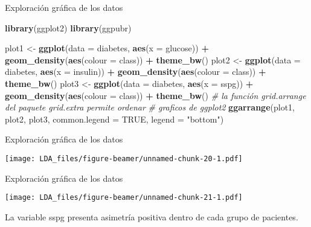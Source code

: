 \documentclass[ignorenonframetext,]{beamer}
\newenvironment{Shaded}{\begin{snugshade}}{\end{snugshade}}
\newcommand{\KeywordTok}[1]{\textcolor[rgb]{0.13,0.29,0.53}{\textbf{#1}}}
\newcommand{\DataTypeTok}[1]{\textcolor[rgb]{0.13,0.29,0.53}{#1}}
\newcommand{\StringTok}[1]{\textcolor[rgb]{0.31,0.60,0.02}{#1}}
\newcommand{\CommentTok}[1]{\textcolor[rgb]{0.56,0.35,0.01}{\textit{#1}}}
\newcommand{\OtherTok}[1]{\textcolor[rgb]{0.56,0.35,0.01}{#1}}
\newcommand{\OperatorTok}[1]{\textcolor[rgb]{0.81,0.36,0.00}{\textbf{#1}}}
\newcommand{\NormalTok}[1]{#1}
\begin{document}
\begin{frame}[fragile]{Exploración gráfica de los datos}

\begin{Shaded}
\begin{Highlighting}[]
\KeywordTok{library}\NormalTok{(ggplot2)}
\KeywordTok{library}\NormalTok{(ggpubr)}

\NormalTok{plot1 <-}\StringTok{ }\KeywordTok{ggplot}\NormalTok{(}\DataTypeTok{data =}\NormalTok{ diabetes, }\KeywordTok{aes}\NormalTok{(}\DataTypeTok{x =}\NormalTok{ glucose)) }\OperatorTok{+}
\StringTok{  }\KeywordTok{geom_density}\NormalTok{(}\KeywordTok{aes}\NormalTok{(}\DataTypeTok{colour =}\NormalTok{ class)) }\OperatorTok{+}\StringTok{ }\KeywordTok{theme_bw}\NormalTok{()}
\NormalTok{plot2 <-}\StringTok{ }\KeywordTok{ggplot}\NormalTok{(}\DataTypeTok{data =}\NormalTok{ diabetes, }\KeywordTok{aes}\NormalTok{(}\DataTypeTok{x =}\NormalTok{ insulin)) }\OperatorTok{+}
\StringTok{  }\KeywordTok{geom_density}\NormalTok{(}\KeywordTok{aes}\NormalTok{(}\DataTypeTok{colour =}\NormalTok{ class)) }\OperatorTok{+}\StringTok{ }\KeywordTok{theme_bw}\NormalTok{()}
\NormalTok{plot3 <-}\StringTok{ }\KeywordTok{ggplot}\NormalTok{(}\DataTypeTok{data =}\NormalTok{ diabetes, }\KeywordTok{aes}\NormalTok{(}\DataTypeTok{x =}\NormalTok{ sspg)) }\OperatorTok{+}
\StringTok{  }\KeywordTok{geom_density}\NormalTok{(}\KeywordTok{aes}\NormalTok{(}\DataTypeTok{colour =}\NormalTok{ class)) }\OperatorTok{+}\StringTok{ }\KeywordTok{theme_bw}\NormalTok{()}
\CommentTok{# la función grid.arrange del paquete grid.extra permite ordenar}
\CommentTok{# graficos de ggplot2}
\KeywordTok{ggarrange}\NormalTok{(plot1, plot2, plot3, }\DataTypeTok{common.legend =} \OtherTok{TRUE}\NormalTok{, }\DataTypeTok{legend =} \StringTok{"bottom"}\NormalTok{)}
\end{Highlighting}
\end{Shaded}

\end{frame}

\begin{frame}{Exploración gráfica de los datos}

\texttt{[image: LDA\_files/figure-beamer/unnamed-chunk-20-1.pdf]}

\end{frame}

\begin{frame}{Exploración gráfica de los datos}

\hypertarget{left}{}
\texttt{[image: LDA\_files/figure-beamer/unnamed-chunk-21-1.pdf]}

\hypertarget{right}{}
La variable sspg presenta asimetría positiva dentro de cada grupo de
pacientes.

\end{frame}
\end{document}
